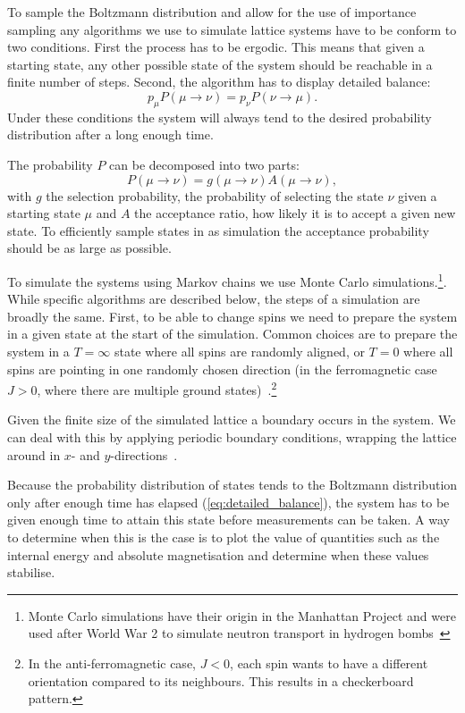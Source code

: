 \documentclass[11pt, a4paper]{report} %
\begin{document}
To sample the Boltzmann distribution and allow for the use of importance sampling any algorithms we use to simulate lattice systems have to be conform to two conditions.
First the process has to be ergodic.
This means that given a starting state, any other possible state of the system should be reachable in a finite number of steps.
Second, the algorithm has to display detailed balance:
\begin{equation}\label{eq:detailed_balance}
	p_{\mu} P(\mu \to \nu) = p_{\nu} P(\nu \to \mu).
\end{equation}
Under these conditions the system will always tend to the desired probability distribution after a long enough time.

The probability \(P\) can be decomposed into two parts:
\begin{equation}
	P(\mu\to\nu) = g(\mu\to\nu) A(\mu\to \nu),
\end{equation}
with \(g\) the selection probability, the probability of selecting the state \(\nu\) given a starting state \(\mu\) and \(A\) the acceptance ratio, how likely it is to accept a given new state.
To efficiently sample states in as simulation the acceptance probability should be as large as possible.

To simulate the systems using Markov chains we use Monte Carlo simulations.\footnote{Monte Carlo simulations have their origin in the Manhattan Project and were used after World War 2 to simulate neutron transport in hydrogen bombs~\cite{newman:1999}}.
While specific algorithms are described below, the steps of a simulation are broadly the same.
First, to be able to change spins we need to prepare the system in a given state at the start of the simulation.
Common choices are to prepare the system in a \(T=\infty\) state where all spins are randomly aligned, or \(T=0\) where all spins are pointing in one randomly chosen direction (in the ferromagnetic case \(J>0\), where there are multiple ground states)~\cite{newman:1999}.\footnote{In the anti-ferromagnetic case, \(J < 0\), each spin wants to have a different orientation compared to its neighbours. This results in a checkerboard pattern.}

Given the finite size of the simulated lattice a boundary occurs in the system.
We can deal with this by applying periodic boundary conditions, wrapping the lattice around in \(x\)- and \(y\)-directions~\cite{landau:2015}.

Because the probability distribution of states tends to the Boltzmann distribution only after enough time has elapsed (\cref{eq:detailed_balance}), the system has to be given enough time to attain this state before measurements can be taken.
A way to determine when this is the case is to plot the value of quantities such as the internal energy and absolute magnetisation and determine when these values stabilise.
\end{document}
